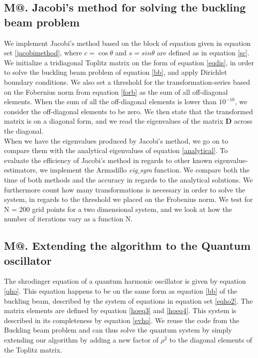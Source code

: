 \documentclass[%
reprint,
amsmath, 
amssymb, 
aps,]{revtex4-1}
\makeatletter
\newcommand*{\rom}[1]{\expandafter\@slowromancap\romannumeral #1@}
\makeatother
\begin{document}
		\subsection*{M\rom{1}. Jacobi's method for solving the buckling beam problem}
\noindent We implement Jacobi's method based on the block of equation given in equation set \ref{jacobimethod}, where $c = \cos{\theta}$ and $s = sin{\theta}$ are defined as in equation \ref{sc}. We initialize a tridiagonal Toplitz matrix on the form of equation \ref{eqdis}, in order to solve the buckling beam problem of equation \ref{bb}, and apply Dirichlet boundary conditions. We also set a threshold for the transformation-series based on the Fobernius norm from equation \ref{forb} as the sum of all off-diagonal elements. When the sum of all the off-diagonal elements is lower than $10^{-10}$, we consider the off-diagonal elements to be zero. We then state that the transformed matrix is on a diagonal form, and we read the eigenvalues of the matrix $\mathbf{D}$ across the diagonal. \\ \indent 
When we have the eigenvalues produced by Jacobi's method, we go on to compare them with the analytical eigenvalues of equation \ref{analytical}. To evaluate the efficiency of Jacobi's method in regards to other known eigenvalue-estimators, we implement the Armadillo \textit{eig$\_$sym} function. We compare both the time of both methods and the accuracy in regards to the analytical solutions. We furthermore count how many transformations is necessary in order to solve the system, in regards to the threshold we placed on the Frobenius norm. We test for N = 200 grid points for a two dimensional system, and we look at how  the number of iterations vary as a function N. 
		\subsection*{M\rom{2}. Extending the algorithm to the Quantum oscillator} \noindent
The shrodinger equation of a quantum harmonic oscillator is given by  equation \ref{qho}. This equation happens to be on the same form as equation \ref{bb} of the buckling beam, described by the system of equations in equation set \ref{eqho2}. The matrix elements are defined by equation \ref{hoeq3} and \ref{hoeq4}. This system is described in its completeness by equation \ref{evho}. We reuse the code from the Buckling beam problem and can thus solve the quantum system by simply extending our algorithm by adding a new factor of $\rho^2$ to the diagonal elements of the Toplitz matrix. 
\end{document}
